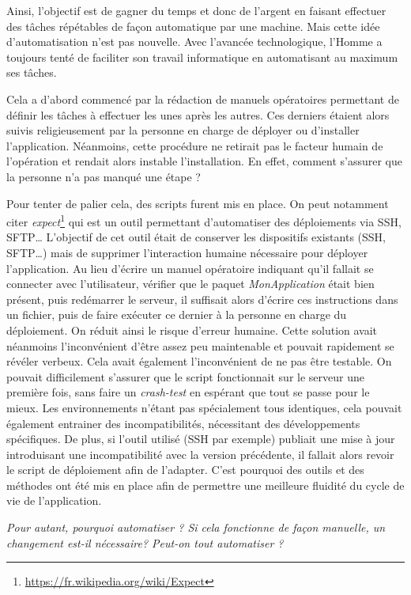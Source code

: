 Ainsi, l'objectif est de gagner du temps et donc de l'argent en faisant effectuer des tâches répétables de façon automatique par une machine. Mais cette idée d'automatisation n'est pas nouvelle. Avec l'avancée technologique, l'Homme a toujours tenté de faciliter son travail informatique en automatisant au maximum ses tâches. 

Cela a d'abord commencé par la rédaction de manuels opératoires permettant de définir les tâches à effectuer les unes après les autres. Ces derniers étaient alors suivis religieusement par la personne en charge de déployer ou d'installer l'application. Néanmoins, cette procédure ne retirait pas le facteur humain de l'opération et rendait alors instable l'installation. En effet, comment s'assurer que la personne n'a pas manqué une étape ? 

Pour tenter de palier cela, des scripts furent mis en place. On peut notamment citer \emph{expect}\footnote{\url{https://fr.wikipedia.org/wiki/Expect}} qui est un outil permettant d'automatiser des déploiements via \gls{SSH}, \gls{SFTP}\ldots{} L'objectif de cet outil était de conserver les dispositifs existants (\gls{SSH}, \gls{SFTP}\ldots) mais de supprimer l'interaction humaine nécessaire pour déployer l'application. Au lieu d'écrire un manuel opératoire indiquant qu'il fallait se connecter avec l'utilisateur, vérifier que le paquet \emph{MonApplication} était bien présent, puis redémarrer le serveur, il suffisait alors d'écrire ces instructions dans un fichier, puis de faire exécuter ce dernier à la personne en charge du déploiement. On réduit ainsi le risque d'erreur humaine. Cette solution avait néanmoins l'inconvénient d'être assez peu maintenable et pouvait rapidement se révéler verbeux. Cela avait également l'inconvénient de ne pas être testable. On pouvait difficilement s'assurer que le script fonctionnait sur le serveur une première fois, sans faire un \emph{crash-test} en espérant que tout se passe pour le mieux. Les environnements n'étant pas spécialement tous identiques, cela pouvait également entrainer des incompatibilités, nécessitant des développements spécifiques. De plus, si l'outil utilisé (\gls{SSH} par exemple) publiait une mise à jour introduisant une incompatibilité avec la version précédente, il fallait alors revoir le script de déploiement afin de l'adapter. C'est pourquoi des outils et des méthodes ont été mis en place afin de permettre une meilleure fluidité du cycle de vie de l'application. 

\emph{Pour autant, pourquoi automatiser ? Si cela fonctionne de façon manuelle, un changement est-il nécessaire? Peut-on tout automatiser ?}

